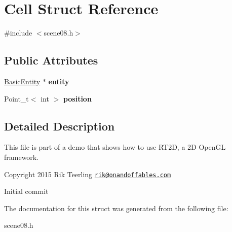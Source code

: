 \hypertarget{struct_cell}{}\section{Cell Struct Reference}
\label{struct_cell}


{\ttfamily \#include $<$scene08.\+h$>$}

\subsection*{Public Attributes}
\begin{DoxyCompactItemize}
\item 
\mbox{\label{struct_cell_accfbd18f0fa411f6183acd4117db87cb}} 
\hyperlink{class_basic_entity}{Basic\+Entity} $\ast$ {\bfseries entity}
\item 
\mbox{\label{struct_cell_a8e96c5ebe7be73e259c8de816273fe15}} 
Point\+\_\+t$<$ int $>$ {\bfseries position}
\end{DoxyCompactItemize}


\subsection{Detailed Description}
This file is part of a demo that shows how to use R\+T2D, a 2D Open\+GL framework.


\begin{DoxyItemize}
\item Copyright 2015 Rik Teerling \href{mailto:rik@onandoffables.com}{\tt rik@onandoffables.\+com}
\begin{DoxyItemize}
\item Initial commit 
\end{DoxyItemize}
\end{DoxyItemize}

The documentation for this struct was generated from the following file\+:\begin{DoxyCompactItemize}
\item 
scene08.\+h\end{DoxyCompactItemize}
